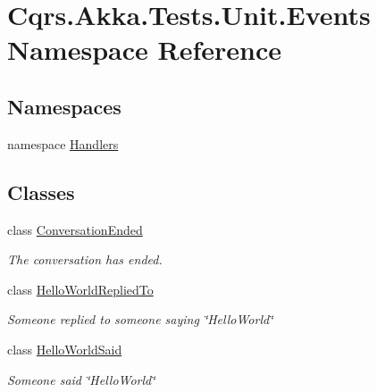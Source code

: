 \hypertarget{namespaceCqrs_1_1Akka_1_1Tests_1_1Unit_1_1Events}{}\section{Cqrs.\+Akka.\+Tests.\+Unit.\+Events Namespace Reference}
\label{namespaceCqrs_1_1Akka_1_1Tests_1_1Unit_1_1Events}
\subsection*{Namespaces}
\begin{DoxyCompactItemize}
\item 
namespace \hyperlink{namespaceCqrs_1_1Akka_1_1Tests_1_1Unit_1_1Events_1_1Handlers}{Handlers}
\end{DoxyCompactItemize}
\subsection*{Classes}
\begin{DoxyCompactItemize}
\item 
class \hyperlink{classCqrs_1_1Akka_1_1Tests_1_1Unit_1_1Events_1_1ConversationEnded}{Conversation\+Ended}
\begin{DoxyCompactList}\small\item\em The conversation has ended. \end{DoxyCompactList}\item 
class \hyperlink{classCqrs_1_1Akka_1_1Tests_1_1Unit_1_1Events_1_1HelloWorldRepliedTo}{Hello\+World\+Replied\+To}
\begin{DoxyCompactList}\small\item\em Someone replied to someone saying \char`\"{}\+Hello\+World\char`\"{} \end{DoxyCompactList}\item 
class \hyperlink{classCqrs_1_1Akka_1_1Tests_1_1Unit_1_1Events_1_1HelloWorldSaid}{Hello\+World\+Said}
\begin{DoxyCompactList}\small\item\em Someone said \char`\"{}\+Hello\+World\char`\"{} \end{DoxyCompactList}\end{DoxyCompactItemize}
